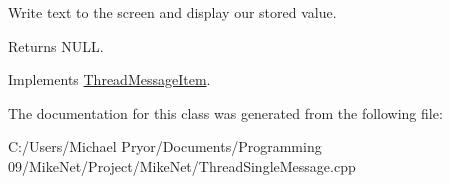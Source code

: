 Write text to the screen and display our stored value. 

\begin{DoxyReturn}{Returns}
NULL. 
\end{DoxyReturn}


Implements \hyperlink{class_thread_message_item_ae09a47834e313524b19700ebc92b0dfe}{ThreadMessageItem}.



The documentation for this class was generated from the following file:\begin{DoxyCompactItemize}
\item 
C:/Users/Michael Pryor/Documents/Programming 09/MikeNet/Project/MikeNet/ThreadSingleMessage.cpp\end{DoxyCompactItemize}
